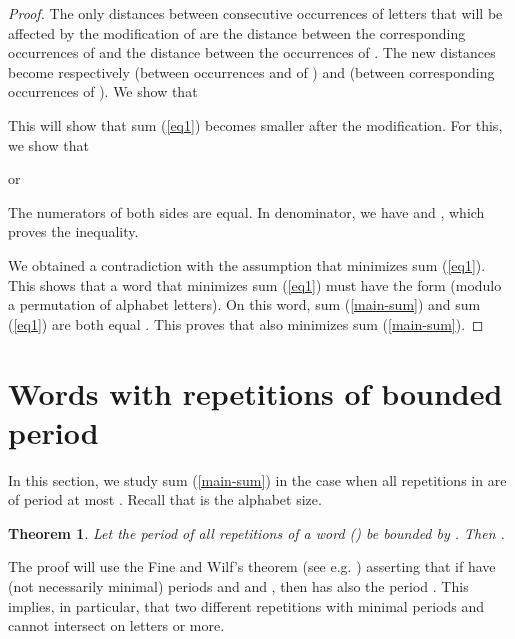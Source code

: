 \documentclass[11pt]{article}
\newtheorem{theorem}{Theorem}
\begin{document}
\begin{proof}
The only distances between consecutive occurrences of letters that
will be affected by the modification of  are the distance
 between the corresponding occurrences of  and the
distance  between the occurrences of . The new
distances become respectively  (between occurrences  and  of ) and
 (between corresponding occurrences of ). We show that 

This will show that sum (\ref{eq1}) becomes
smaller after the modification. For this, we show that 

or

The numerators of both sides are equal. In denominator, we have
 and , which proves the inequality. 

We obtained a contradiction with the assumption that  minimizes sum
(\ref{eq1}). This shows that a word that minimizes sum (\ref{eq1})
must have the form  (modulo a
permutation of alphabet letters). On this word, sum (\ref{main-sum})
and sum (\ref{eq1}) are both equal . This proves that
 also minimizes sum (\ref{main-sum}). 
\end{proof}

\section{Words with repetitions of bounded period}
\label{boundedp}

In this section, we study sum (\ref{main-sum}) in the case when all
repetitions in  are of period at most . Recall that  is the
alphabet size. 

\begin{theorem}
\label{t4}
Let the period of all repetitions of a word  () be bounded
by . Then
.
\end{theorem}

The proof will use the Fine and Wilf's theorem (see
e.g. \cite{Lothaire83}) asserting that if  have (not necessarily
minimal) periods  and  and , 
then  has also the period . This implies, in particular, that two
different repetitions with minimal periods  and  cannot intersect on
 letters or more. 
\end{document}
